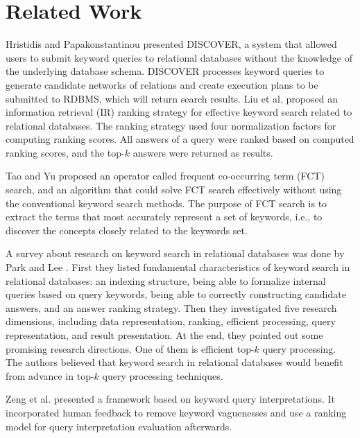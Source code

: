 \documentclass[conference]{IEEEtran}
\begin{document}
\section{Related Work}

 Hristidis and Papakonstantinou \cite{hristidis2002discover} presented DISCOVER, a system that allowed users to submit keyword queries to relational databases without the knowledge of the underlying database schema. DISCOVER processes keyword queries to generate candidate networks of relations and create execution plans to be submitted to RDBMS, which will return search results.
Liu et al. \cite{liu2006effective} proposed an information retrieval (IR) ranking strategy for effective keyword search related to relational databases. The ranking strategy used four normalization factors for computing ranking scores. 
All answers of a query were ranked based on computed ranking scores, and the top-$k$ answers were returned as results.

 Tao and Yu \cite{tao2009finding} proposed an operator called frequent co-occurring term (FCT) search, and an algorithm that could solve FCT search effectively without using the conventional keyword search methods. The purpose of FCT search is to extract the terms that most accurately represent a set of keywords, i.e., to discover the concepts closely related to the keywords set.

 A survey about research on keyword search in relational databases was done by Park and Lee \cite{park2011keyword}. First they listed fundamental characteristics of keyword search in relational databases: an indexing structure, being able to formalize internal queries based on query keywords, being able to correctly constructing candidate answers, and an answer ranking strategy. Then they investigated five research dimensions, including data representation, ranking, efficient processing, query representation, and result presentation. At the end, they pointed out some promising research directions. One of them is efficient top-$k$ query processing. The authors believed that keyword search in relational databases would benefit from advance in top-$k$ query processing techniques.


 Zeng et al. \cite{zeng2012isearch} presented a framework based on keyword query interpretations. It incorporated human feedback to remove keyword vaguenesses and use a ranking model for query interpretation evaluation afterwards.
\end{document}

